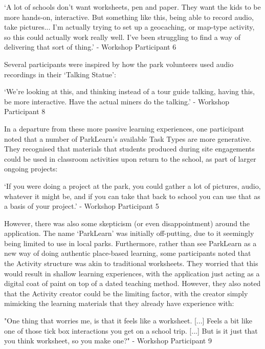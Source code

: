 \begin{displayquote}
`A lot of schools don't want worksheets, pen and paper. They want the kids to be more hands-on, interactive. But something like this, being able to record audio, take pictures... I'm actually trying to set up a geocaching, or map-type activity, so this could actually work really well. I've been struggling to find a way of delivering that sort of thing.' - Workshop Participant 6
\end{displayquote}

Several participants were inspired by how the park volunteers used audio recordings in their `Talking Statue':

\begin{displayquote}
`We're looking at this, and thinking instead of a tour guide talking, having this, be more interactive. Have the actual miners do the talking.' - Workshop Participant 8
\end{displayquote}

In a departure from these more passive learning experiences, one participant noted that a number of ParkLearn's available Task Types are more generative. They recognised that materials that students produced during site engagements could be used in classroom activities upon return to the school, as part of larger ongoing projects:

\begin{displayquote}
`If you were doing a project at the park, you could gather a lot of pictures, audio, whatever it might be, and if you can take that back to school you can use that as a basis of your project.' - Workshop Participant 5
\end{displayquote}

However, there was also some skepticism (or even disappointment) around the application. The name `ParkLearn' was initially off-putting, due to it seemingly being limited to use in local parks. Furthermore, rather than see ParkLearn as a new way of doing authentic place-based learning, some participants noted that the Activity structure was akin to traditional worksheets. They worried that this would result in shallow learning experiences, with the application just acting as a digital coat of paint on top of a dated teaching method. However, they also noted that the Activity creator could be the limiting factor, with the creator simply mimicking the learning materials that they already have experience with:

\begin{displayquote}
"One thing that worries me, is that it feels like a worksheet. [...] Feels a bit like one of those tick box interactions you get on a school trip. [...] But is it just that you think worksheet, so you make one?" - Workshop Participant 9
\end{displayquote}

